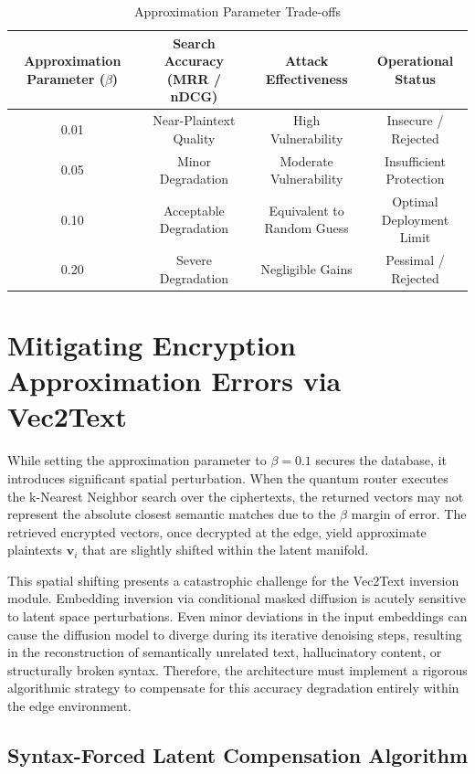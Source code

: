 \documentclass[12pt]{article}
\begin{document}
\begin{table}[h]
\centering
\begin{tabular}{|c|c|c|c|}
\hline
\textbf{Approximation Parameter ($\beta$)} & \textbf{Search Accuracy (MRR / nDCG)} & \textbf{Attack Effectiveness} & \textbf{Operational Status} \\
\hline
0.01 & Near-Plaintext Quality & High Vulnerability & Insecure / Rejected \\
0.05 & Minor Degradation & Moderate Vulnerability & Insufficient Protection \\
0.10 & Acceptable Degradation & Equivalent to Random Guess & Optimal Deployment Limit \\
0.20 & Severe Degradation & Negligible Gains & Pessimal / Rejected \\
\hline
\end{tabular}
\caption{Approximation Parameter Trade-offs}
\end{table}

\section{Mitigating Encryption Approximation Errors via Vec2Text}

While setting the approximation parameter to $\beta = 0.1$ secures the database, it introduces significant spatial perturbation. When the quantum router executes the k-Nearest Neighbor search over the ciphertexts, the returned vectors may not represent the absolute closest semantic matches due to the $\beta$ margin of error. The retrieved encrypted vectors, once decrypted at the edge, yield approximate plaintexts $\mathbf{v}_i$ that are slightly shifted within the latent manifold.

This spatial shifting presents a catastrophic challenge for the Vec2Text inversion module. Embedding inversion via conditional masked diffusion is acutely sensitive to latent space perturbations. Even minor deviations in the input embeddings can cause the diffusion model to diverge during its iterative denoising steps, resulting in the reconstruction of semantically unrelated text, hallucinatory content, or structurally broken syntax. Therefore, the architecture must implement a rigorous algorithmic strategy to compensate for this accuracy degradation entirely within the edge environment.

\subsection{Syntax-Forced Latent Compensation Algorithm}
\end{document}
